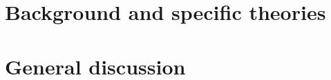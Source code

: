 
%
%
%



\newtoggle{long-llms}\toggletrue{long-llms}







%

\mainmatter

\part{Background and specific theories}















%

\part{General discussion}\label{part-discussion}

















\appendix






